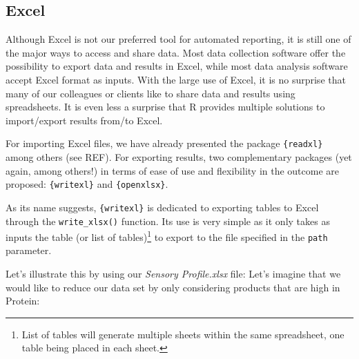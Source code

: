 \documentclass[
]{book}
\begin{document}
\hypertarget{excel}{%
\subsection{Excel}\label{excel}}

Although Excel is not our preferred tool for automated reporting, it is still one of the major ways to access and share data. Most data collection software offer the possibility to export data and results in Excel, while most data analysis software accept Excel format as inputs. With the large use of Excel, it is no surprise that many of our colleagues or clients like to share data and results using spreadsheets. It is even less a surprise that R provides multiple solutions to import/export results from/to Excel.

For importing Excel files, we have already presented the package \texttt{\{readxl\}} among others (see REF). For exporting results, two complementary packages (yet again, among others!) in terms of ease of use and flexibility in the outcome are proposed: \texttt{\{writexl\}} and \texttt{\{openxlsx\}}.

As its name suggests, \texttt{\{writexl\}} is dedicated to exporting tables to Excel through the \texttt{write\_xlsx()} function. Its use is very simple as it only takes as inputs the table (or list of tables)\footnote{List of tables will generate multiple sheets within the same spreadsheet, one table being placed in each sheet.} to export to the file specified in the \texttt{path} parameter.

Let's illustrate this by using our \emph{Sensory Profile.xlsx} file: Let's imagine that we would like to reduce our data set by only considering products that are high in Protein:
\end{document}

